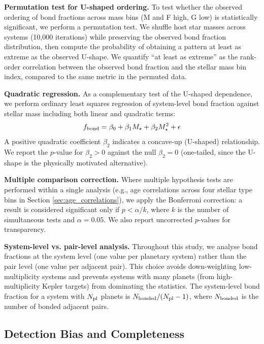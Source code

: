 \documentclass[twocolumn,usenatbib]{mnras}
\begin{document}
\textbf{Permutation test for U-shaped ordering.} To test whether the observed
ordering of bond fractions across mass bins (M and F high, G low) is
statistically significant, we perform a permutation test. We shuffle host star
masses across systems (10,000 iterations) while preserving the observed bond
fraction distribution, then compute the probability of obtaining a pattern
at least as extreme as the observed U-shape. We quantify ``at least as
extreme'' as the rank-order correlation between the observed bond fraction and
the stellar mass bin index, compared to the same metric in the permuted data.

\textbf{Quadratic regression.} As a complementary test of the U-shaped
dependence, we perform ordinary least squares regression of system-level bond
fraction against stellar mass including both linear and quadratic terms:
\begin{equation}
f_{\rm bond} = \beta_0 + \beta_1 M_\star + \beta_2 M_\star^2 + \epsilon
\label{eq:quad}
\end{equation}
A positive quadratic coefficient $\beta_2$ indicates a concave-up (U-shaped)
relationship. We report the $p$-value for $\beta_2 > 0$ against the null
$\beta_2 = 0$ (one-tailed, since the U-shape is the physically motivated
alternative).

\textbf{Multiple comparison correction.} Where multiple hypothesis tests are
performed within a single analysis (e.g., age correlations across four stellar
type bins in Section \ref{sec:age_correlations}), we apply the Bonferroni
correction: a result is considered significant only if $p < \alpha / k$, where
$k$ is the number of simultaneous tests and $\alpha = 0.05$. We also report
uncorrected $p$-values for transparency.

\textbf{System-level vs. pair-level analysis.} Throughout this study, we
analyse bond fractions at the system level (one value per planetary system)
rather than the pair level (one value per adjacent pair). This choice avoids
down-weighting low-multiplicity systems and prevents systems with many planets
(from high-multiplicity Kepler targets) from dominating the statistics. The
system-level bond fraction for a system with $N_{\rm pl}$ planets is
$N_{\rm bonded} / (N_{\rm pl} - 1)$, where $N_{\rm bonded}$ is the number of
bonded adjacent pairs.

\subsection{Detection Bias and Completeness}
\label{sec:bias}
\end{document}
